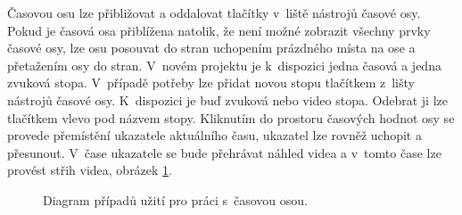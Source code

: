 Časovou osu lze přibližovat a oddalovat tlačítky v~liště nástrojů časové osy. Pokud je časová osa přiblížena natolik, že není možné zobrazit všechny prvky časové osy, lze osu posouvat do stran uchopením prázdného místa na ose a přetažením osy do stran. V~novém projektu je k~dispozici jedna časová a jedna zvuková stopa. V~případě potřeby lze přidat novou stopu tlačítkem z~lišty nástrojů časové osy. K~dispozici je buď zvuková nebo video stopa. Odebrat ji lze tlačítkem vlevo pod názvem stopy. Kliknutím do prostoru časových hodnot osy se provede přemístění ukazatele aktuálního času, ukazatel lze rovněž uchopit a přesunout. V~čase ukazatele se bude přehrávat náhled videa a v~tomto čase lze provést střih videa, obrázek \ref{img:ucd-osa}.
\begin{figure}[h]
	\centering
	\caption{Diagram případů užití pro práci s~časovou osou.}\label{img:ucd-osa}
\end{figure}

